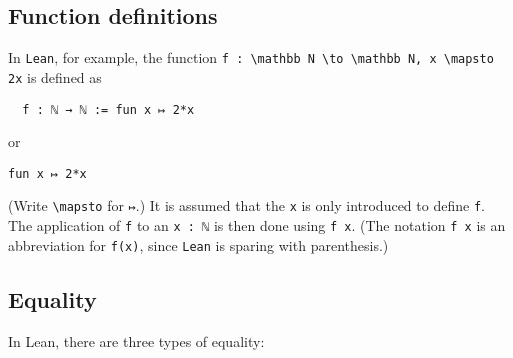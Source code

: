 \documentclass{memoir}
\begin{document}
\subsection{Function definitions}

In \Verb|Lean|, for example, the function \Verb|f : \mathbb N \to \mathbb N, x \mapsto 2x| is defined as

\begin{verbatim}
  f : ℕ → ℕ := fun x ↦ 2*x

\end{verbatim}


or

\begin{verbatim}
fun x ↦ 2*x

\end{verbatim}


(Write \Verb|\mapsto| for \Verb|↦|.) It is assumed that the \Verb|x| is only introduced to
define \Verb|f|. The application of \Verb|f| to an \Verb|x : ℕ| is then done using \Verb|f x|. (The notation \Verb|f x| is an abbreviation for \Verb|f(x)|, since \Verb|Lean| is sparing with parenthesis.)



\subsection{Equality}

In Lean, there are three types of equality:
\end{document}
